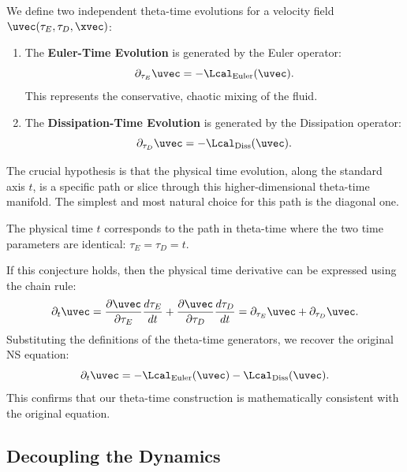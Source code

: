 \begin{definition}
We define two independent theta-time evolutions for a velocity field $\uvec(\tau_E, \tau_D, \xvec)$:
\begin{enumerate}
    \item The \textbf{Euler-Time Evolution} is generated by the Euler operator:
    \begin{equation}
        \partial_{\tau_E} \uvec = -\Lcal_{\text{Euler}}(\uvec).
    \end{equation}
    This represents the conservative, chaotic mixing of the fluid.
    \item The \textbf{Dissipation-Time Evolution} is generated by the Dissipation operator:
    \begin{equation}
        \partial_{\tau_D} \uvec = -\Lcal_{\text{Diss}}(\uvec).
    \end{equation}
\end{enumerate}
\end{definition}

The crucial hypothesis is that the physical time evolution, along the standard axis $t$, is a specific path or slice through this higher-dimensional theta-time manifold. The simplest and most natural choice for this path is the diagonal one.

\begin{conjecture}
The physical time $t$ corresponds to the path in theta-time where the two time parameters are identical: $\tau_E = \tau_D = t$.
\end{conjecture}

If this conjecture holds, then the physical time derivative can be expressed using the chain rule:
\begin{equation}
    \partial_t \uvec = \frac{\partial \uvec}{\partial \tau_E}\frac{d\tau_E}{dt} + \frac{\partial \uvec}{\partial \tau_D}\frac{d\tau_D}{dt} = \partial_{\tau_E} \uvec + \partial_{\tau_D} \uvec.
\end{equation}
Substituting the definitions of the theta-time generators, we recover the original NS equation:
\begin{equation}
    \partial_t \uvec = -\Lcal_{\text{Euler}}(\uvec) - \Lcal_{\text{Diss}}(\uvec).
\end{equation}
This confirms that our theta-time construction is mathematically consistent with the original equation.

\subsection{Decoupling the Dynamics}

